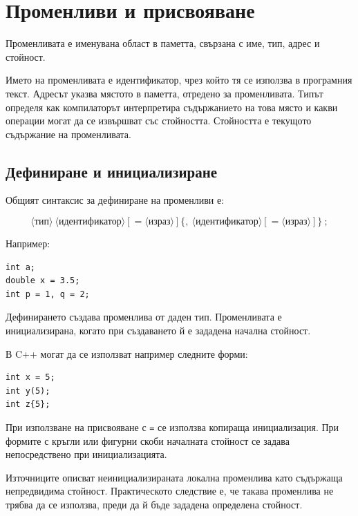 \section{Променливи и присвояване}\label{s:14.5}

\begin{defn}[Променлива]
Променливата е именувана област в паметта, свързана с име, тип, адрес и стойност.
\end{defn}

Името на променливата е идентификатор, чрез който тя се използва в програмния текст. Адресът указва мястото в паметта, отредено за променливата. Типът определя как компилаторът интерпретира съдържанието на това място и какви операции могат да се извършват със стойността. Стойността е текущото съдържание на променливата.

\subsection{Дефиниране и инициализиране}\label{s:14.5.1}

Общият синтаксис за дефиниране на променливи е:

\[
\langle\text{тип}\rangle\ \langle\text{идентификатор}\rangle
[\mathrel{=}\langle\text{израз}\rangle]
\{
,\ \langle\text{идентификатор}\rangle
[\mathrel{=}\langle\text{израз}\rangle]
\}\ ;
\]

Например:

\begin{verbatim}
int a;
double x = 3.5;
int p = 1, q = 2;
\end{verbatim}

Дефинирането създава променлива от даден тип. Променливата е инициализирана, когато при създаването й е зададена начална стойност.

В C++ могат да се използват например следните форми:

\begin{verbatim}
int x = 5;
int y(5);
int z{5};
\end{verbatim}

При използване на присвояване с \texttt{=} се използва копираща инициализация. При формите с кръгли или фигурни скоби началната стойност се задава непосредствено при инициализацията.

\begin{supp}[Бележка]
Източниците описват неинициализираната локална променлива като съдържаща непредвидима стойност. Практическото следствие е, че такава променлива не трябва да се използва, преди да й бъде зададена определена стойност.
\end{supp}

